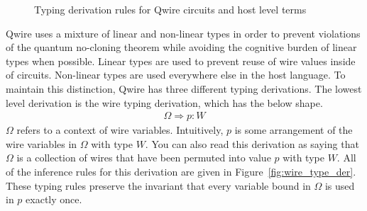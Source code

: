 \begin{figure}[t]
        \caption{Typing derivation rules for Qwire circuits and host level terms}
        \label{fig:circuit_typ_der}
    \end{figure}

Qwire uses a mixture of linear and non-linear types in order to prevent violations of the quantum no-cloning theorem while avoiding the cognitive burden of linear types when possible.
Linear types are used to prevent reuse of wire values inside of circuits.
Non-linear types are used everywhere else in the host language.
To maintain this distinction, Qwire has three different typing derivations.
The lowest level derivation is the wire typing derivation, which has the below shape.
\begin{align*}
\Omega \Rightarrow p : W
\end{align*}
$\Omega$ refers to a context of wire variables.
Intuitively, $p$ is some arrangement of the wire variables in $\Omega$ with type $W$.
You can also read this derivation as saying that $\Omega$ is a collection of wires that have been permuted into value $p$ with type $W$.
All of the inference rules for this derivation are given in Figure~\ref{fig:wire_type_der}.
These typing rules preserve the invariant that every variable bound in $\Omega$ is used in $p$ exactly once.

